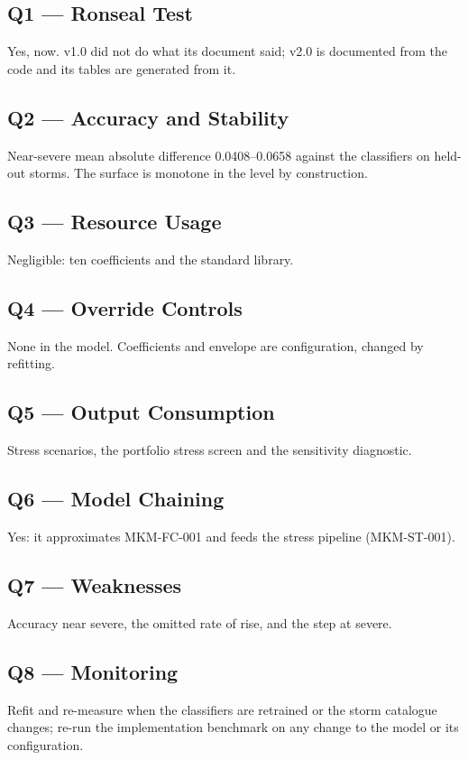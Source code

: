 \documentclass[11pt,a4paper]{article}
\newcommand{\fpNearMaeLo}{0.0408}
\newcommand{\fpNearMaeHi}{0.0658}
\begin{document}
\subsection{Q1 --- Ronseal Test}
Yes, now. v1.0 did not do what its document said; v2.0 is documented from the code
and its tables are generated from it.

\subsection{Q2 --- Accuracy and Stability}
Near-severe mean absolute difference \fpNearMaeLo{}--\fpNearMaeHi{} against the
classifiers on held-out storms. The surface is monotone in the level by construction.

\subsection{Q3 --- Resource Usage}
Negligible: ten coefficients and the standard library.

\subsection{Q4 --- Override Controls}
None in the model. Coefficients and envelope are configuration, changed by refitting.

\subsection{Q5 --- Output Consumption}
Stress scenarios, the portfolio stress screen and the sensitivity diagnostic.

\subsection{Q6 --- Model Chaining}
Yes: it approximates MKM-FC-001 and feeds the stress pipeline (MKM-ST-001).

\subsection{Q7 --- Weaknesses}
Accuracy near severe, the omitted rate of rise, and the step at severe.

\subsection{Q8 --- Monitoring}
Refit and re-measure when the classifiers are retrained or the storm catalogue
changes; re-run the implementation benchmark on any change to the model or its
configuration.
\end{document}
